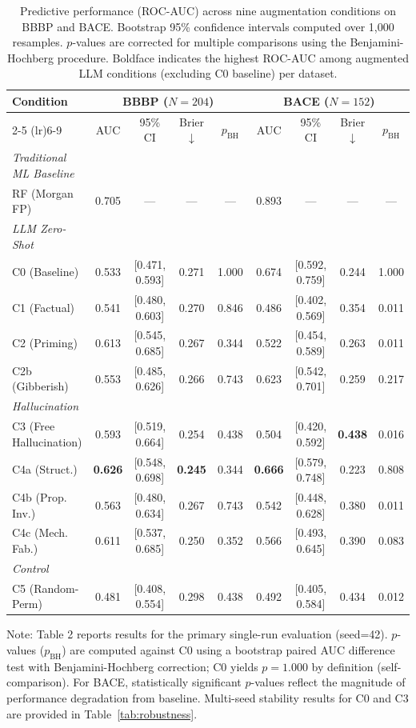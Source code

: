 \begin{table}[t]
\centering
\caption{Predictive performance (ROC-AUC) across nine augmentation conditions on BBBP and BACE. Bootstrap 95\% confidence intervals computed over 1,000 resamples. $p$-values are corrected for multiple comparisons using the Benjamini-Hochberg procedure. Boldface indicates the highest ROC-AUC among augmented LLM conditions (excluding C0 baseline) per dataset.}
\label{tab:results}
\small
\begin{tabular*}{\linewidth}{@{\extracolsep{\fill}}lcccccccc@{}}
\toprule
\textbf{Condition} & \multicolumn{4}{c}{\textbf{BBBP ($N=204$)}} & \multicolumn{4}{c}{\textbf{BACE ($N=152$)}} \\ \cmidrule(lr){2-5} \cmidrule(lr){6-9}
 & AUC & 95\% CI & Brier $\downarrow$ & $p_{\text{BH}}$ & AUC & 95\% CI & Brier $\downarrow$ & $p_{\text{BH}}$ \\ \midrule
\textit{Traditional ML Baseline} & & & & & & & & \\
RF (Morgan FP) & 0.705 & --- & --- & --- & 0.893 & --- & --- & --- \\ \midrule
\textit{LLM Zero-Shot} & & & & & & & & \\
C0 (Baseline) & 0.533 & [0.471, 0.593] & 0.271 & 1.000 & 0.674 & [0.592, 0.759] & 0.244 & 1.000 \\
C1 (Factual) & 0.541 & [0.480, 0.603] & 0.270 & 0.846 & 0.486 & [0.402, 0.569] & 0.354 & 0.011 \\
C2 (Priming) & 0.613 & [0.545, 0.685] & 0.267 & 0.344 & 0.522 & [0.454, 0.589] & 0.263 & 0.011 \\
C2b (Gibberish) & 0.553 & [0.485, 0.626] & 0.266 & 0.743 & 0.623 & [0.542, 0.701] & 0.259 & 0.217 \\ \midrule
\textit{Hallucination} & & & & & & & & \\
C3 (Free Hallucination) & 0.593 & [0.519, 0.664] & 0.254 & 0.438 & 0.504 & [0.420, 0.592] & \textbf{0.438} & 0.016 \\
C4a (Struct.) & \textbf{0.626} & [0.548, 0.698] & \textbf{0.245} & 0.344 & \textbf{0.666} & [0.579, 0.748] & 0.223 & 0.808 \\
C4b (Prop. Inv.) & 0.563 & [0.480, 0.634] & 0.267 & 0.743 & 0.542 & [0.448, 0.628] & 0.380 & 0.011 \\
C4c (Mech. Fab.) & 0.611 & [0.537, 0.685] & 0.250 & 0.352 & 0.566 & [0.493, 0.645] & 0.390 & 0.083 \\ \midrule
\textit{Control} & & & & & & & & \\
C5 (Random-Perm) & 0.481 & [0.408, 0.554] & 0.298 & 0.438 & 0.492 & [0.405, 0.584] & 0.434 & 0.012 \\ \bottomrule
\end{tabular*}

\vspace{0.5em}
{\footnotesize Note: Table 2 reports results for the primary single-run evaluation (seed=42). $p$-values ($p_{\text{BH}}$) are computed against C0 using a bootstrap paired AUC difference test with Benjamini-Hochberg correction; C0 yields $p=1.000$ by definition (self-comparison). For BACE, statistically significant $p$-values reflect the magnitude of performance degradation from baseline. Multi-seed stability results for C0 and C3 are provided in Table~\ref{tab:robustness}.}
\end{table}
